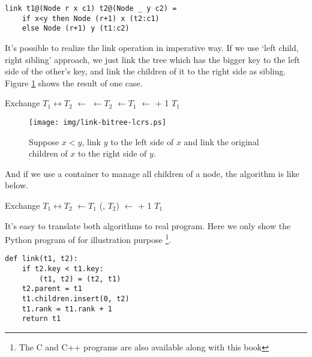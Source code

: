 \documentclass{article}
\begin{document}
\lstset{language=Haskell}
\begin{lstlisting}
link t1@(Node r x c1) t2@(Node _ y c2) =
    if x<y then Node (r+1) x (t2:c1)
    else Node (r+1) y (t1:c2)
\end{lstlisting}

It's possible to realize the link operation in imperative way.
If we use `left child, right sibling' approach, we just link
the tree which has the bigger key to the left side of the other's
key, and link the children of it to the right side as sibling.
Figure \ref{fig:link-lcrs} shows the result of one case.

\begin{algorithmic}[1]
    \State Exchange $T_1 \leftrightarrow T_2$
  \EndIf
  \State {} $\gets$ 
  \State {} $\gets T_2$
  \State {} $\gets T_1$
  \State {} $\gets$  + 1
  \State \Return $T_1$
\EndFunction
\end{algorithmic}

\begin{figure}[htbp]
  \centering
  \texttt{[image: img/link-bitree-lcrs.ps]}
  \caption{Suppose $x < y$, link $y$ to the left side of $x$ and link the original children of $x$ to the right side of $y$.} \label{fig:link-lcrs}
\end{figure}

And if we use a container to manage all children of a node, the
algorithm is like below.

\begin{algorithmic}[1]
    \State Exchange $T_1 \leftrightarrow T_2$
  \EndIf
  \State {} $\gets T_1$
  \State {}(, $T_2$)
  \State {} $\gets$  + 1
  \State \Return $T_1$
\EndFunction
\end{algorithmic}

It's easy to translate both algorithms to real program. Here we only show the Python program of  for illustration purpose \footnote{The C and C++ programs are also available along with this book}.

\lstset{language=Python}
\begin{lstlisting}
def link(t1, t2):
    if t2.key < t1.key:
        (t1, t2) = (t2, t1)
    t2.parent = t1
    t1.children.insert(0, t2)
    t1.rank = t1.rank + 1
    return t1
\end{lstlisting}
\end{document}
